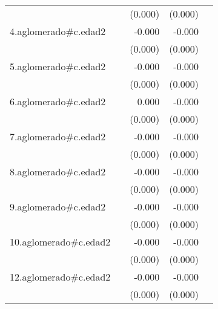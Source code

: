 {\begin{longtable}{l*{4}{D{.}{.}{-1}}}
            &                     &     (0.000)         &     (0.000)         &                     \\
\addlinespace
4.aglomerado#c.edad2&                     &      -0.000         &      -0.000\sym{*}  &                     \\
            &                     &     (0.000)         &     (0.000)         &                     \\
\addlinespace
5.aglomerado#c.edad2&                     &      -0.000         &      -0.000         &                     \\
            &                     &     (0.000)         &     (0.000)         &                     \\
\addlinespace
6.aglomerado#c.edad2&                     &       0.000         &      -0.000         &                     \\
            &                     &     (0.000)         &     (0.000)         &                     \\
\addlinespace
7.aglomerado#c.edad2&                     &      -0.000         &      -0.000         &                     \\
            &                     &     (0.000)         &     (0.000)         &                     \\
\addlinespace
8.aglomerado#c.edad2&                     &      -0.000         &      -0.000         &                     \\
            &                     &     (0.000)         &     (0.000)         &                     \\
\addlinespace
9.aglomerado#c.edad2&                     &      -0.000         &      -0.000\sym{***}&                     \\
            &                     &     (0.000)         &     (0.000)         &                     \\
\addlinespace
10.aglomerado#c.edad2&                     &      -0.000         &      -0.000\sym{**} &                     \\
            &                     &     (0.000)         &     (0.000)         &                     \\
\addlinespace
12.aglomerado#c.edad2&                     &      -0.000         &      -0.000\sym{*}  &                     \\
            &                     &     (0.000)         &     (0.000)         &                     \\

\end{longtable}}
